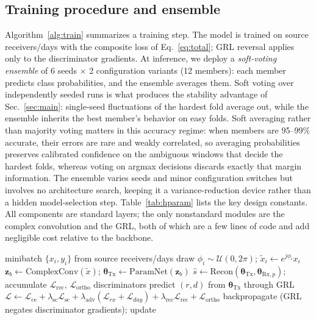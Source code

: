 \documentclass[journal]{IEEEtran}
\newcommand{\npie}{\textsc{NPIE}}
\newcommand{\tx}{\boldsymbol{\theta}_{\mathrm{Tx}}}
\newcommand{\rxp}{\boldsymbol{\theta}_{\mathrm{Rx},p}}
\begin{document}
\subsection{Training procedure and ensemble}
\label{sec:training}
Algorithm~\ref{alg:train} summarizes a training step. The model is trained on source receivers/days with the composite loss of Eq.~\eqref{eq:total}; GRL reversal applies only to the discriminator gradients. At inference, we deploy a \emph{soft-voting ensemble} of 6 seeds $\times$ 2 configuration variants (12 members): each member predicts class probabilities, and the ensemble averages them. Soft voting over independently seeded runs is what produces the stability advantage of Sec.~\ref{sec:main}: single-seed fluctuations of the hardest fold average out, while the ensemble inherits the best member's behavior on easy folds. Soft averaging rather than majority voting matters in this accuracy regime: when members are 95--99\% accurate, their errors are rare and weakly correlated, so averaging probabilities preserves calibrated confidence on the ambiguous windows that decide the hardest folds, whereas voting on argmax decisions discards exactly that margin information. The ensemble varies seeds and minor configuration switches but involves no architecture search, keeping it a variance-reduction device rather than a hidden model-selection step. Table~\ref{tab:hparam} lists the key design constants. All components are standard layers; the only nonstandard modules are the complex convolution and the GRL, both of which are a few lines of code and add negligible cost relative to the backbone.

\begin{algorithm}[t]
\caption{\npie\ training step}
\label{alg:train}
\begin{algorithmic}[1]
\REQUIRE minibatch $\{x_i, y_i\}$ from source receivers/days
\STATE draw $\phi_i \sim \mathcal{U}(0,2\pi)$; $\tilde{x}_i \leftarrow e^{j\phi_i} x_i$ 
\STATE $\mathbf{z}_b \leftarrow \mathrm{ComplexConv}(\tilde{x})$; $\tx \leftarrow \mathrm{ParamNet}(\mathbf{z}_b)$
\STATE $\hat{s} \leftarrow \mathrm{Recon}(\tx, \rxp)$; accumulate $\mathcal{L}_{\mathrm{rec}}$, $\mathcal{L}_{\mathrm{ortho}}$
\STATE discriminators predict $(r,d)$ from $\tx$ through GRL
\STATE $\mathcal{L} \leftarrow \mathcal{L}_{\mathrm{ce}} + \lambda_{\mathrm{sc}}\mathcal{L}_{\mathrm{sc}} + \lambda_{\mathrm{adv}}(\mathcal{L}_{rx}+\mathcal{L}_{day}) + \lambda_{\mathrm{rec}}\mathcal{L}_{\mathrm{rec}} + \mathcal{L}_{\mathrm{ortho}}$
\STATE backpropagate (GRL negates discriminator gradients); update
\end{algorithmic}
\end{algorithm}
\end{document}
